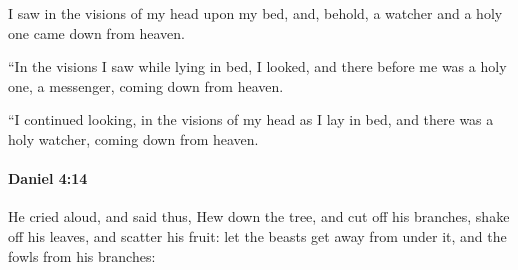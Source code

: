 			\begin{versebox}
					\item[BHS] 
					\item[LXX] 
					\item[ASV] I saw in the visions of my head upon my bed, and, behold, a watcher and a holy one came down from heaven.
					\item[NIV] “In the visions I saw while lying in bed, I looked, and there before me was a holy one, a messenger, coming down from heaven.
					\item[NRSV] “I continued looking, in the visions of my head as I lay in bed, and there was a holy watcher, coming down from heaven.
			\end{versebox}

		\paragraph{Daniel 4:14} %
			\label{DANIEL-4-14}

			He cried aloud, and said thus, Hew down the tree, and cut off his branches, shake off his leaves, and scatter his fruit: let the beasts get away from under it, and the fowls from his branches:

